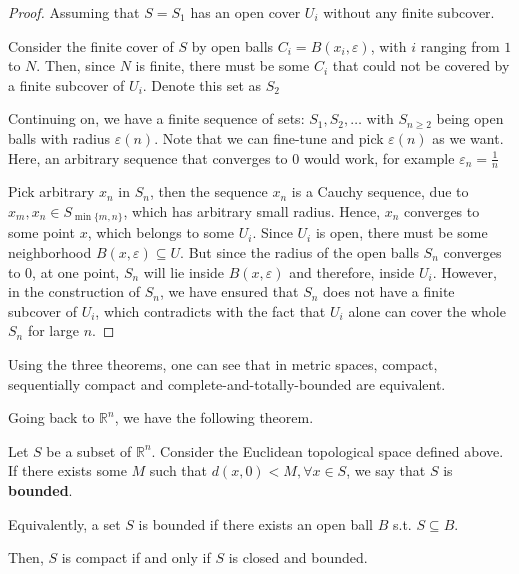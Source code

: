 \begin{proof}
  Assuming that \( S = S_{1} \) has an open cover \( U_{i} \) without any
  finite subcover.

  Consider the finite cover of \( S \) by open balls \( C_{i} = B(x_{i},
  \varepsilon) \), with \( i \) ranging from \( 1 \) to \( N \). Then, since \(
  N\) is finite, there must be some \( C_{i} \) that could not be covered by a
  finite subcover of \( U_{i} \). Denote this set as \( S_{2} \)

  Continuing on, we have a finite sequence of sets: \( S_{1}, S_{2}, \ldots  \)
  with \( S_{n\ge 2} \) being open balls with radius \( \varepsilon(n) \). Note
  that we can fine-tune and pick \( \varepsilon(n) \) as we want. Here, an
  arbitrary sequence that converges to \( 0 \) would work, for example \(
  \varepsilon_{n} = \frac{1}{n} \)

  Pick arbitrary \( x_{n} \)  in \( S_{n} \), then the sequence \( x_{n} \) is a
  Cauchy sequence, due to \( x_{m}, x_{n} \in S_{\min \{m,n\}  } \), which has
  arbitrary small radius. Hence, \( x_{n} \) converges to some point \( x \),
  which belongs to some \( U_{i} \). Since \( U_{i} \) is open, there must be
  some neighborhood \( B(x, \varepsilon) \subseteq U \). But since the radius of
  the open balls \( S_{n} \) converges to \( 0 \), at one point, \( S_{n} \)
  will lie inside \( B(x, \varepsilon) \) and therefore, inside \( U_{i} \).
  However, in the construction of \( S_{n} \), we have ensured that \( S_{n} \)
  does not have a finite subcover of \( U_{i} \), which contradicts with the
  fact that \( U_{i} \) alone can cover the whole \( S_{n} \) for large \( n \).
\end{proof}

Using the three theorems, one can see that in metric spaces, compact,
sequentially compact and complete-and-totally-bounded are equivalent.

Going back to \( \mathbb{R}^{n} \), we have the following theorem.

\begin{theorem}
  Let \( S \) be a subset of \( \mathbb{R}^{n} \). Consider the Euclidean
  topological space defined above. If there exists some \( M \) such that \(
  d(x, 0) < M, \forall x \in S \), we say that \( S \) is \textbf{bounded}.

  Equivalently, a set \( S \) is bounded if there exists an open ball \( B \)
  s.t. \( S \subseteq B \).

  Then, \( S \) is compact if and only if \( S \) is closed and bounded.
\end{theorem}

